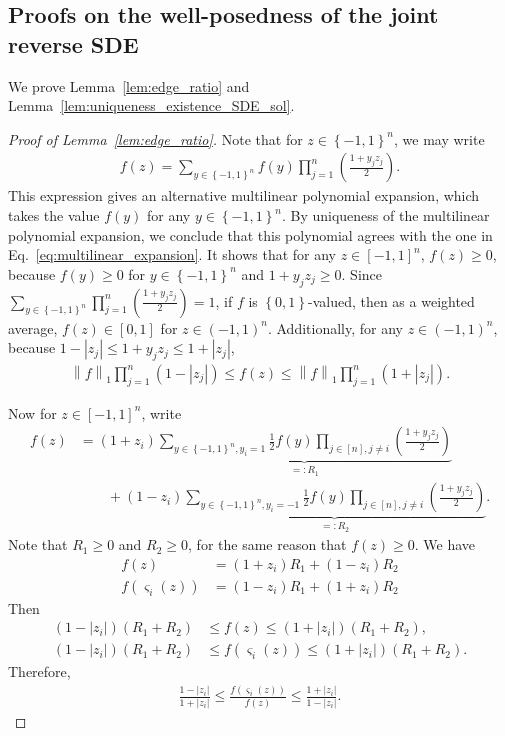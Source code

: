 \documentclass[11pt]{article}
\newcommand{\flip}{\varsigma}
\theoremstyle{named}
\theoremstyle{plain}
\newcommand{\parenth}[1]{\left( #1 \right)}
\newcommand{\braces}[1]{\left\{ #1 \right \}}
\newcommand{\abss}[1]{\left| #1 \right |}
\newcommand{\vecnorm}[2]{\left\| #1\right\|_{#2}}
\begin{document}
\subsection{Proofs on the well-posedness of the joint reverse SDE}
\label{sub:proof_related_to_smoothness}
We prove Lemma~\ref{lem:edge_ratio} and Lemma~\ref{lem:uniqueness_existence_SDE_sol}.

\begin{proof}[Proof of Lemma~\ref{lem:edge_ratio}]
  Note that for $z \in \braces{-1, 1}^n$, we may write
  \begin{align*}
    f(z) = \sum_{y \in \braces{-1, 1}^n} f(y) \prod_{j=1}^n \parenth{\frac{1+y_j z_j}{2}}.
  \end{align*}
  This expression gives an alternative multilinear polynomial expansion, which takes the value $f(y)$ for any $y \in \braces{-1,1}^n$. By uniqueness of the multilinear polynomial expansion, we conclude that this polynomial agrees with the one in Eq.~\eqref{eq:multilinear_expansion}. It shows that for any $z \in [-1, 1]^n$, $f(z) \geq 0$,
  because $f(y) \geq 0$ for $y\in \braces{-1, 1}^n$ and $1+y_j z_j \geq 0$. Since $\sum_{y \in \braces{-1, 1}^n} \prod_{j=1}^n \parenth{\frac{1+y_j z_j}{2}} = 1$, if $f$ is $\braces{0,1}$-valued, then as a weighted average, $f(z) \in [0,1]$ for $z \in (-1,1)^n$. Additionally, for any $z\in (-1,1)^n$, because $1 - \abss{z_j} \leq 1+y_j z_j \leq 1 + \abss{z_j}$, 
  \begin{align*}
    \vecnorm{f}{1} \prod_{j=1}^n (1-\abss{z_j}) \leq f(z) \leq \vecnorm{f}{1} \prod_{j=1}^n (1+\abss{z_j}).
  \end{align*}

  Now for $z\in [-1, 1]^n$, write
  \begin{align*}
    f(z) &= (1+z_i) \underbrace{\sum_{y \in \braces{-1, 1}^n, y_i = 1} \frac12   f(y) \prod_{j \in [n], j \neq i} \parenth{\frac{1+y_j z_j}{2}} }_{=: R_1} \\
    &\qquad + (1-z_i) \underbrace{\sum_{y \in \braces{-1, 1}^n, y_i = -1} \frac12 f(y) \prod_{j \in [n], j \neq i} \parenth{\frac{1+y_j z_j}{2}} }_{=: R_2}. 
  \end{align*}
  Note that $R_1 \geq 0$ and $R_2 \geq 0$, for the same reason that $f(z) \geq 0$. We have
  \begin{align*}
    f(z) &= (1+z_i)R_1 + (1-z_i)R_2 \\
    f(\flip_i(z)) &=  (1-z_i)R_1 + (1+z_i)R_2
  \end{align*}
  Then
  \begin{align*}
    (1 - \abss{z_i}) (R_1 + R_2) &\leq f(z) \leq (1 + \abss{z_i}) (R_1 + R_2), \\
    (1 - \abss{z_i}) (R_1 + R_2) &\leq f(\flip_i(z)) \leq (1 + \abss{z_i}) (R_1 + R_2).
  \end{align*}
  Therefore,
  \begin{align*}
    \frac{1 - \abss{z_i}}{1 + \abss{z_i}} \leq \frac{f(\flip_i(z))}{f(z)} \leq \frac{1 + \abss{z_i}}{1 - \abss{z_i}}.
  \end{align*}
\end{proof}
\end{document}

